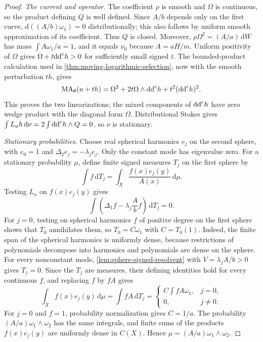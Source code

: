 \begin{proof}
\emph{The current and operator.} The coefficient $\rho$ is smooth and $\Omega$ is continuous, so the product defining $Q$ is well defined. Since $A/b$ depends only on the first curve, $\mathrm{d}((A/b)\omega_1)=0$ distributionally; this also follows by uniform smooth approximation of its coefficient. Thus $Q$ is closed. Moreover, $\rho\Omega^2=(A/a)\,\mathrm{d}W$ has mass $\int A\omega_1/a=1$, and it equals $\nu_0$ because $A=aH/m$. Uniform positivity of $\Omega$ gives $\Omega+t\mathrm{dd}^{\mathrm{c}} h>0$ for sufficiently small signed $t$. The bounded-product calculation used in \cref{thm:moving-logarithmic-selection}, now with the smooth perturbation $th$, gives
\[
 \mathrm{MA}_\theta(u+th)
       =\Omega^2+2t\Omega\wedge\mathrm{dd}^{\mathrm{c}} h+t^2(\mathrm{dd}^{\mathrm{c}} h)^2.
\]
This proves the two linearizations; the mixed components of $\mathrm{dd}^{\mathrm{c}} h$ have zero wedge product with the diagonal form $\Omega$. Distributional Stokes gives $\int L_uh\,\mathrm{d}\nu=2\int\mathrm{dd}^{\mathrm{c}} h\wedge Q=0$, so $\nu$ is stationary.

\emph{Stationary probabilities.} Choose real spherical harmonics $e_j$ on the second sphere, with $e_0=1$ and $\Delta_2e_j=-\lambda_je_j$. Only the constant mode has eigenvalue zero. For a stationary probability $\mu$, define finite signed measures $T_j$ on the first sphere by
\[
 \int f\,\mathrm{d}T_j
       =\int_X\frac{f(x)e_j(y)}{A(x)}\,\mathrm{d}\mu.
\]
Testing $L_u$ on $f(x)e_j(y)$ gives
\[
 \int\left(\Delta_1f-\lambda_j\frac Ab f\right)\,\mathrm{d}T_j=0.
\]
For $j=0$, testing on spherical harmonics $f$ of positive degree on the first sphere shows that $T_0$ annihilates them, so $T_0=C\omega_1$ with $C=T_0(1)$. Indeed, the finite span of the spherical harmonics is uniformly dense, because restrictions of polynomials decompose into harmonics and polynomials are dense on the sphere. For every nonconstant mode, \cref{lem:sphere-signed-resolvent} with $V=\lambda_jA/b>0$ gives $T_j=0$. Since the $T_j$ are measures, their defining identities hold for every continuous $f$, and replacing $f$ by $fA$ gives
\[
 \int_Xf(x)e_j(y)\,\mathrm{d}\mu=\int fA\,\mathrm{d}T_j
       =\begin{cases}C\int fA\omega_1,&j=0,\\0,&j\ne0.\end{cases}
\]
For $j=0$ and $f=1$, probability normalization gives $C=1/a$. The probability $(A/a)\omega_1\wedge\omega_2$ has the same integrals, and finite sums of the products $f(x)e_j(y)$ are uniformly dense in $C(X)$. Hence $\mu=(A/a)\omega_1\wedge\omega_2$.


\end{proof}
